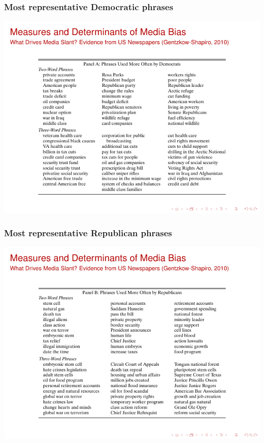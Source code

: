 \documentclass[english]{beamer}
\begin{document}
\begin{frame}
\frametitle{Most representative Democratic phrases}
\begin{center}
\includegraphics[scale=1.13]{Images/gentzkow_table1.pdf}
\end{center}
\end{frame}

\begin{frame}
\frametitle{Most representative Republican phrases}
\begin{center}
\includegraphics[scale=1.13]{Images/gentzkow_table2.pdf}
\end{center}
\end{frame}
\end{document}
